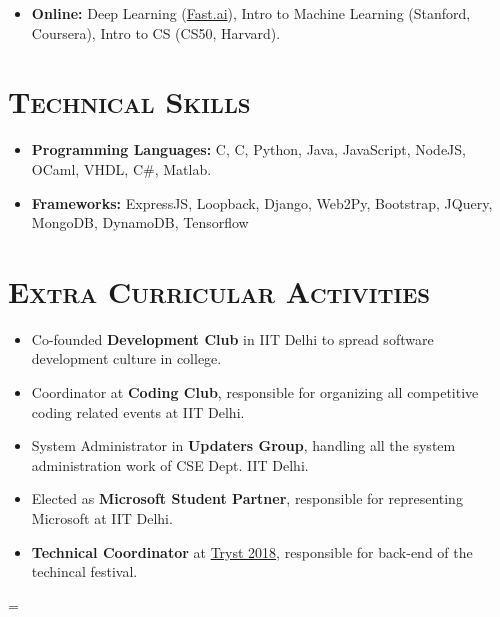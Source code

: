 \documentclass{article}
\newenvironment{longversion}{}{} %
\newenvironment{absolutelynopagebreak}
  {\par\nobreak\vfil\penalty0\vfilneg
   \vtop\bgroup}
  {\par\xdef\tpd{\the\prevdepth}\egroup
   \prevdepth=\tpd}
\newcommand{\CPP}
{C\nolinebreak[4]\hspace{-.05em}\raisebox{.22ex}{\footnotesize\bf ++}}
\newcommand{\tmpsection}[1]{}
\let\tmpsection=\section
\renewcommand{\section}[1]{\tmpsection*{\textsc{#1}}}
\begin{document}
\begin{absolutelynopagebreak}
\begin{longversion}
\begin{itemize}
\item \textbf{Online:}
Deep Learning (\href{http://www.fast.ai/}{Fast.ai}), Intro to Machine Learning (Stanford, Coursera), Intro to CS (CS50, Harvard).
\end{itemize}
\end{longversion}


\begin{longversion}
\section{Technical Skills}\begin{itemize}
\item \textbf{Programming Languages:}  C, \CPP, Python, Java, JavaScript, NodeJS, OCaml, VHDL, C\#, Matlab.
\item \textbf{Frameworks:} ExpressJS, Loopback, Django, Web2Py, Bootstrap, JQuery, MongoDB, DynamoDB, Tensorflow


\end{itemize}

\end{longversion}

\section{Extra Curricular Activities}


\begin{itemize}
    \setlength\itemsep{0em}
    \item Co-founded \textbf{Development Club} in IIT Delhi to spread software development culture in college.
    \item Coordinator at \textbf{Coding Club}, responsible for organizing all competitive coding related events at IIT Delhi.
    \item System Administrator in \textbf{Updaters Group}, handling all the system administration work of CSE Dept. IIT Delhi.
    \item Elected as \textbf{Microsoft Student Partner}, responsible for representing Microsoft at IIT Delhi. 
    \item \textbf{Technical Coordinator} at \href{http://tryst-iitd.com/}{Tryst 2018}, responsible for back-end of the techincal festival.
     

\end{itemize}
\end{absolutelynopagebreak}
\end{document}
